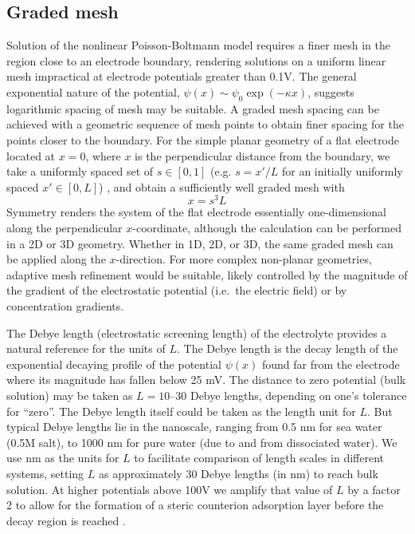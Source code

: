 \subsection{Graded mesh}
Solution of the nonlinear Poisson-Boltmann model requires a finer mesh in the  region
close to an electrode boundary, rendering solutions on a uniform linear mesh  impractical at electrode
potentials greater than 0.1V.  The general exponential nature of the potential,
$\psi(x) \sim \psi_{0} \exp(-\kappa x)$, suggests logarithmic spacing of
mesh may be suitable.
A graded mesh spacing can be achieved with a geometric sequence of
mesh points  to obtain finer spacing for the points closer to the boundary.
For the simple planar geometry of a flat electrode located at $x=0$,
where $x$ is the perpendicular distance from the boundary,
we take a uniformly spaced set of $s \in [0,1]$  (e.g. $s=x'/L$ for an
initially uniformly spaced $x'\in [0,L]$) , and obtain a sufficiently
well graded mesh with
\begin{equation}
  x = s^3 L
\end{equation}
Symmetry renders the system of the flat electrode essentially one-dimensional along the
perpendicular $x$-coordinate, although the calculation can be performed in a 2D
or 3D geometry. Whether in 1D, 2D, or 3D, the same graded mesh can be
applied  along the  $x$-direction.
For more complex non-planar geometries, adaptive mesh refinement would
be suitable, likely controlled by the magnitude of the gradient of the
electrostatic potential (i.e.\ the electric field) or by concentration
gradients.

The Debye length (electrostatic screening length) of the electrolyte
provides a natural reference for the units of $L$. The Debye length is
the  decay length of the exponential decaying profile of the potential $\psi(x)$
found far from the electrode where its magnitude has fallen below 25
mV. The distance to zero potential (bulk solution) may be taken as
$L=10$--30 Debye lengths, depending on one's tolerance for
``zero''. The Debye length itself could be taken as the length unit
for $L$. But typical Debye lengths lie in the nanoscale, ranging from 0.5 nm for
sea water (0.5M salt), to 1000 nm for pure water (due to  and
 from dissociated water). We use nm as the units for $L$ to facilitate
comparison of length scales in different systems, setting $L$ as
approximately 30 Debye lengths (in nm) to reach bulk solution. At
higher potentials above
100V we amplify that value of $L$ by a factor 2 to allow for the formation of a steric counterion adsorption
layer before the decay region is reached \cite{DagmawiParsons2022}.

